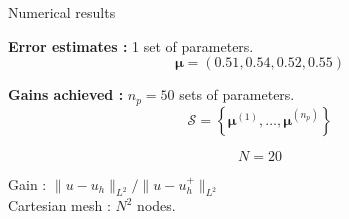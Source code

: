 \begin{frame}[noframenumbering]{Numerical results}
	\hspace{-5pt}\begin{minipage}[t]{0.46\linewidth}
		\textbf{Error estimates :} 1 set of parameters.
		$$\bm{\mu}=(0.51,0.54,0.52,0.55)$$
		\vspace{-35pt}
		\begin{figure}[H]
		\end{figure}
	\end{minipage} \qquad \small
	\begin{minipage}[t]{0.48\linewidth}
		\textbf{Gains achieved :} $n_p=50$ sets of parameters.
		$$\mathcal{S}=\left\{\bm{\mu}^{(1)},\dots,\bm{\mu}^{(n_p)}\right\}$$
		\vspace{-15pt}
		\begin{table}[H]
		\end{table}

		\normalsize\centering\vspace{-20pt}
		$$N=20$$

		\vspace{-5pt}
		Gain : $\| u-u_h\|_{L^2} / \| u-u_h^+\|_{L^2}$ \\
		
		\small\vspace{8pt}
		Cartesian mesh : $N^2$ nodes.
	\end{minipage}
\end{frame}

